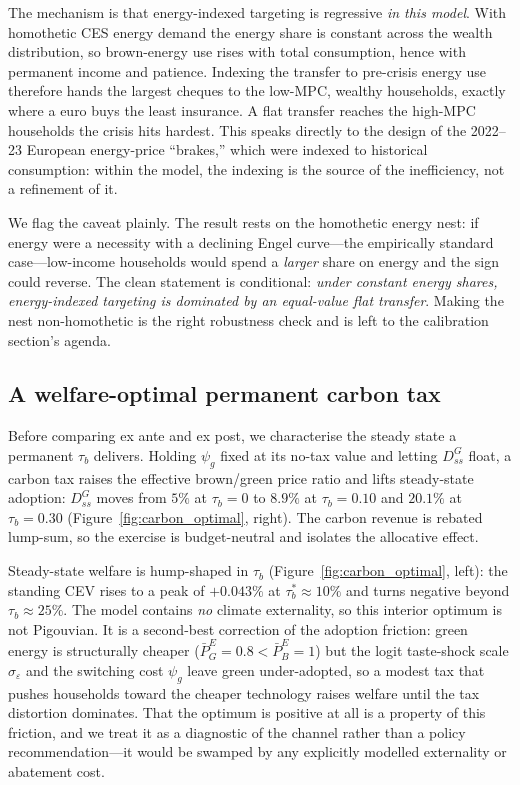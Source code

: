 The mechanism is that energy-indexed targeting is regressive \emph{in this
model}. With homothetic CES energy demand the energy share is constant across the
wealth distribution, so brown-energy use rises with total consumption, hence with
permanent income and patience. Indexing the transfer to pre-crisis energy use
therefore hands the largest cheques to the low-MPC, wealthy households, exactly
where a euro buys the least insurance. A flat transfer reaches the high-MPC
households the crisis hits hardest. This speaks directly to the design of the
2022--23 European energy-price ``brakes,'' which were indexed to historical
consumption: within the model, the indexing is the source of the inefficiency,
not a refinement of it.

We flag the caveat plainly. The result rests on the homothetic energy nest: if
energy were a necessity with a declining Engel curve---the empirically standard
case---low-income households would spend a \emph{larger} share on energy and the
sign could reverse. The clean statement is conditional: \emph{under constant
energy shares, energy-indexed targeting is dominated by an equal-value flat
transfer}. Making the nest non-homothetic is the right robustness check and is
left to the calibration section's agenda.

\subsection{A welfare-optimal permanent carbon tax}
\label{sec:carbontax}

Before comparing ex ante and ex post, we characterise the steady state a
permanent $\tau_b$ delivers. Holding $\psi_g$ fixed at its no-tax value and
letting $D^{G}_{ss}$ float, a carbon tax raises the effective brown/green price
ratio and lifts steady-state adoption: $D^{G}_{ss}$ moves from $5\%$ at
$\tau_b=0$ to $8.9\%$ at $\tau_b=0.10$ and $20.1\%$ at $\tau_b=0.30$
(Figure~\ref{fig:carbon_optimal}, right). The carbon revenue is rebated
lump-sum, so the exercise is budget-neutral and isolates the allocative effect.

Steady-state welfare is hump-shaped in $\tau_b$
(Figure~\ref{fig:carbon_optimal}, left): the standing CEV rises to a peak of
$+0.043\%$ at $\tau_b^{*}\approx 10\%$ and turns negative beyond
$\tau_b\approx 25\%$. The model contains \emph{no} climate externality, so this
interior optimum is not Pigouvian. It is a second-best correction of the
adoption friction: green energy is structurally cheaper
($\bar P^{E}_{G}=0.8<\bar P^{E}_{B}=1$) but the logit taste-shock scale
$\sigma_\varepsilon$ and the switching cost $\psi_g$ leave green under-adopted, so
a modest tax that pushes households toward the cheaper technology raises welfare
until the tax distortion dominates. That the optimum is positive at all is a
property of this friction, and we treat it as a diagnostic of the channel rather
than a policy recommendation---it would be swamped by any explicitly modelled
externality or abatement cost.

